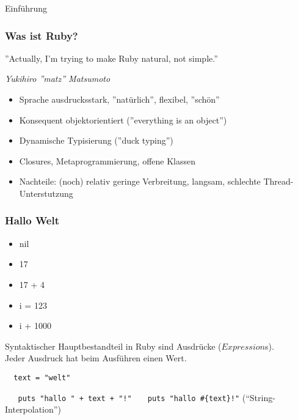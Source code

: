 \documentclass{beamer}
\begin{document}
\lstset{language=Ruby}
\lstset{basicstyle=\small,numbers=none, numberstyle=\tiny, numbersep=5pt}

\begin{frame}{Einführung}
\frametitle{Was ist Ruby?}

\begin{center}
''Actually, I'm trying to make Ruby natural, not simple.'' 
\end{center}
\begin{flushright}
\emph{Yukihiro ''matz'' Matsumoto}
\end{flushright}



\begin{itemize}
\pause \item Sprache ausdrucksstark\pause, ''natürlich''\pause, flexibel\pause, ''schön''
\pause \item Konsequent objektorientiert (''everything is an object'')
\pause \item Dynamische Typisierung (''duck typing'')
\pause \item Closures, Metaprogrammierung, offene Klassen
\pause \item Nachteile: (noch) relativ geringe Verbreitung\pause,  langsam\pause, 
              schlechte Thread-Unterstutzung
\end{itemize}
\end{frame}

\begin{frame}[fragile]
  \frametitle{Hallo Welt}
  \begin{itemize}[<+->]
  \item nil
  \item 17
  \item 17 + 4
  \item i = 123
  \item i + 1000
  \end{itemize}
  \pause
  Syntaktischer Hauptbestandteil in Ruby sind Ausdrücke ($Expression$s).\\
  Jeder Ausdruck hat beim Ausführen einen Wert.\\
  \pause
  \begin{lstlisting}
  text = "welt"
  \end{lstlisting}
  \pause
  \lstinline|   puts "hallo " + text + "!"|
  \pause
  \lstinline|   puts "hallo #{text}!"| \hspace{5em}  (``String-Interpolation'')

\end{frame}
\end{document}
